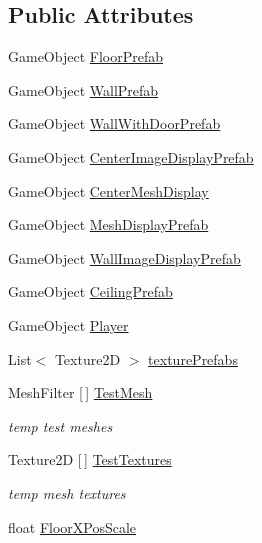 \subsection*{Public Attributes}
\begin{DoxyCompactItemize}
\item 
Game\+Object \mbox{\hyperlink{class_museum_builder_a357c5b16bf4a1b1a10eacfec75bf2869}{Floor\+Prefab}}
\item 
Game\+Object \mbox{\hyperlink{class_museum_builder_adede3b195361b0b02def8c0c26ccb5d0}{Wall\+Prefab}}
\item 
Game\+Object \mbox{\hyperlink{class_museum_builder_a9494f3d21dd268b7d542ece9901e6b7c}{Wall\+With\+Door\+Prefab}}
\item 
Game\+Object \mbox{\hyperlink{class_museum_builder_a1a8a4b93806cc0edfc74a9b94750e96c}{Center\+Image\+Display\+Prefab}}
\item 
Game\+Object \mbox{\hyperlink{class_museum_builder_acb0c15557dd0d3151d42e7b28b57ee31}{Center\+Mesh\+Display}}
\item 
Game\+Object \mbox{\hyperlink{class_museum_builder_adc42d6478ee13f86e50fd0be210d9a4e}{Mesh\+Display\+Prefab}}
\item 
Game\+Object \mbox{\hyperlink{class_museum_builder_ad898a0067b63d2386284e0130849bf9a}{Wall\+Image\+Display\+Prefab}}
\item 
Game\+Object \mbox{\hyperlink{class_museum_builder_a9966f9ce8cc1117cb72e3aa42ea1a490}{Ceiling\+Prefab}}
\item 
Game\+Object \mbox{\hyperlink{class_museum_builder_a57f709574a50b97bb8f44f0d53606c44}{Player}}
\item 
List$<$ Texture2D $>$ \mbox{\hyperlink{class_museum_builder_a0f11ac7ab522b0dfc419a5c2c75788c2}{texture\+Prefabs}}
\item 
Mesh\+Filter \mbox{[}$\,$\mbox{]} \mbox{\hyperlink{class_museum_builder_aac70b019fbefe1d65a4853448eed0609}{Test\+Mesh}}
\begin{DoxyCompactList}\small\item\em temp test meshes \end{DoxyCompactList}\item 
Texture2D \mbox{[}$\,$\mbox{]} \mbox{\hyperlink{class_museum_builder_a002d66342d0fc72765e89a6f78bd312f}{Test\+Textures}}
\begin{DoxyCompactList}\small\item\em temp mesh textures \end{DoxyCompactList}\item 
float \mbox{\hyperlink{class_museum_builder_a754d766babff00a827e99b8bc51ff716}{Floor\+X\+Pos\+Scale}}

\end{DoxyCompactItemize}
